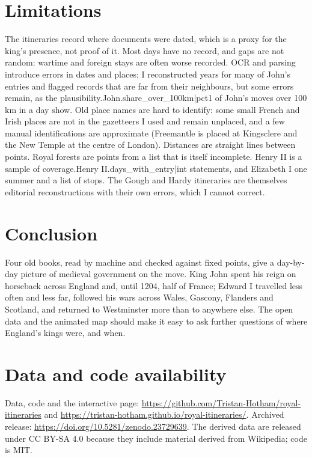 \documentclass[11pt,a4paper]{article}
\begin{document}
\section{Limitations}

The itineraries record where documents were dated, which is a proxy for the king's presence, not proof of it. Most days have no record, and gaps are not random: wartime and foreign stays are often worse recorded. OCR and parsing introduce errors in dates and places; I reconstructed years for many of John's entries and flagged records that are far from their neighbours, but some errors remain, as the {{plausibility.John.share_over_100km|pct1}} of John's moves over 100 km in a day show. Old place names are hard to identify: some small French and Irish places are not in the gazetteers I used and remain unplaced, and a few manual identifications are approximate (Freemantle is placed at Kingsclere and the New Temple at the centre of London). Distances are straight lines between points. Royal forests are points from a list that is itself incomplete. Henry II is a sample of {{coverage.Henry II.days_with_entry|int}} statements, and Elizabeth I one summer and a list of stops. The Gough and Hardy itineraries are themselves editorial reconstructions with their own errors, which I cannot correct.

\section{Conclusion}

Four old books, read by machine and checked against fixed points, give a day-by-day picture of medieval government on the move. King John spent his reign on horseback across England and, until 1204, half of France; Edward I travelled less often and less far, followed his wars across Wales, Gascony, Flanders and Scotland, and returned to Westminster more than to anywhere else. The open data and the animated map should make it easy to ask further questions of where England's kings were, and when.

\section*{Data and code availability}

Data, code and the interactive page: \url{https://github.com/Tristan-Hotham/royal-itineraries} and \url{https://tristan-hotham.github.io/royal-itineraries/}. Archived release: \url{https://doi.org/10.5281/zenodo.23729639}. The derived data are released under CC BY-SA 4.0 because they include material derived from Wikipedia; code is MIT.
\end{document}
